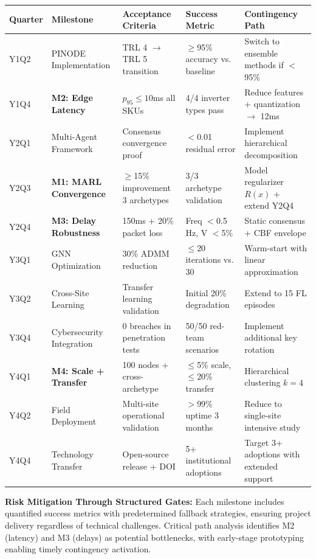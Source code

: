 \documentclass[12pt]{article}
\begin{document}
\begin{center}
\footnotesize
\begin{tabular}{|p{1.2cm}|p{2.8cm}|p{2.2cm}|p{1.8cm}|p{3.5cm}|}
\hline
\textbf{Quarter} & \textbf{Milestone} & \textbf{Acceptance Criteria} & \textbf{Success Metric} & \textbf{Contingency Path} \\
\hline
Y1Q2 & PINODE Implementation & TRL 4 $\rightarrow$ TRL 5 transition & $\geq$95\% accuracy vs. baseline & Switch to ensemble methods if $<$95\% \\
\hline
Y1Q4 & \textbf{M2: Edge Latency} & $p_{95} \leq 10$ms all SKUs & 4/4 inverter types pass & Reduce features + quantization $\rightarrow$ 12ms \\
\hline
Y2Q1 & Multi-Agent Framework & Consensus convergence proof & $<$0.01 residual error & Implement hierarchical decomposition \\
\hline
Y2Q3 & \textbf{M1: MARL Convergence} & $\geq$15\% improvement 3 archetypes & 3/3 archetype validation & Model regularizer $R(x)$ + extend Y2Q4 \\
\hline
Y2Q4 & \textbf{M3: Delay Robustness} & 150ms + 20\% packet loss & Freq $<$0.5 Hz, V $<$5\% & Static consensus + CBF envelope \\
\hline
Y3Q1 & GNN Optimization & 30\% ADMM reduction & $\leq$20 iterations vs. 30 & Warm-start with linear approximation \\
\hline
Y3Q2 & Cross-Site Learning & Transfer learning validation & Initial 20\% degradation & Extend to 15 FL episodes \\
\hline
Y3Q4 & Cybersecurity Integration & 0 breaches in penetration tests & 50/50 red-team scenarios & Implement additional key rotation \\
\hline
Y4Q1 & \textbf{M4: Scale + Transfer} & 100 nodes + cross-archetype & $\leq$5\% scale, $\leq$20\% transfer & Hierarchical clustering $k=4$ \\
\hline
Y4Q2 & Field Deployment & Multi-site operational validation & $>$99\% uptime 3 months & Reduce to single-site intensive study \\
\hline
Y4Q4 & Technology Transfer & Open-source release + DOI & 5+ institutional adoptions & Target 3+ adoptions with extended support \\
\hline
\end{tabular}
\end{center}
\normalsize

\textbf{Risk Mitigation Through Structured Gates:} Each milestone includes quantified success metrics with predetermined fallback strategies, ensuring project delivery regardless of technical challenges. Critical path analysis identifies M2 (latency) and M3 (delays) as potential bottlenecks, with early-stage prototyping enabling timely contingency activation.
\end{document}
